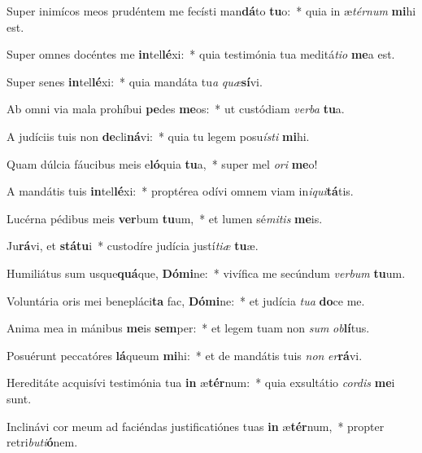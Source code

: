 \item Super inimícos meos prudéntem me fecísti man\textbf{dá}to \textbf{tu}o:~* quia in æ\textit{tér}\textit{num} \textbf{mi}hi est.
\item Super omnes docéntes me \textbf{in}tel\textbf{lé}xi:~* quia testimónia tua meditá\textit{ti}\textit{o} \textbf{me}a est.
\item Super senes \textbf{in}tel\textbf{lé}xi:~* quia mandáta tu\textit{a} \textit{quæ}\textbf{sí}vi.
\item Ab omni via mala prohíbui \textbf{pe}des \textbf{me}os:~* ut custódiam \textit{ver}\textit{ba} \textbf{tu}a.
\item A judíciis tuis non \textbf{de}cli\textbf{ná}vi:~* quia tu legem posu\textit{ís}\textit{ti} \textbf{mi}hi.
\item Quam dúlcia fáucibus meis e\textbf{ló}quia \textbf{tu}a,~* super mel \textit{o}\textit{ri} \textbf{me}o!
\item A mandátis tuis \textbf{in}tel\textbf{lé}xi:~* proptérea odívi omnem viam in\textit{i}\textit{qui}\textbf{tá}tis.
\item Lucérna pédibus meis \textbf{ver}bum \textbf{tu}um,~* et lumen sé\textit{mi}\textit{tis} \textbf{me}is.
\item Ju\textbf{rá}vi, et \textbf{stá}\textbf{tu}i~* custodíre judícia justí\textit{ti}\textit{æ} \textbf{tu}æ.
\item Humiliátus sum usque\textbf{quá}que, \textbf{Dó}\textbf{mi}ne:~* vivífica me secúndum \textit{ver}\textit{bum} \textbf{tu}um.
\item Voluntária oris mei benepláci\textbf{ta} fac, \textbf{Dó}\textbf{mi}ne:~* et judícia \textit{tu}\textit{a} \textbf{do}ce me.
\item Anima mea in mánibus \textbf{me}is \textbf{sem}per:~* et legem tuam non \textit{sum} \textit{ob}\textbf{lí}tus.
\item Posuérunt peccatóres \textbf{lá}queum \textbf{mi}hi:~* et de mandátis tuis \textit{non} \textit{er}\textbf{rá}vi.
\item Hereditáte acquisívi testimónia tua \textbf{in} æ\textbf{tér}num:~* quia exsultátio \textit{cor}\textit{dis} \textbf{me}i sunt.
\item Inclinávi cor meum ad faciéndas justificatiónes tuas \textbf{in} æ\textbf{tér}num,~* propter retri\textit{bu}\textit{ti}\textbf{ó}nem.
